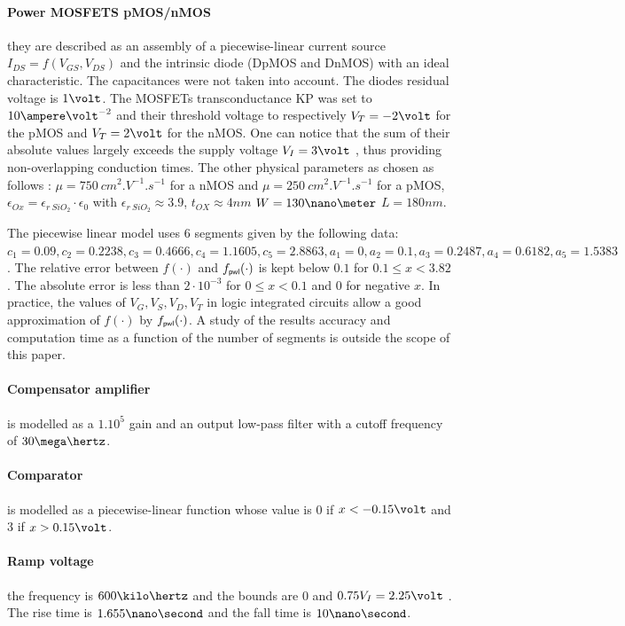 \paragraph{Power MOSFETS pMOS/nMOS} they are described as an assembly of a
piecewise-linear current source $I_{DS} = f(V_{GS}, V_{DS})$ and the intrinsic diode
(DpMOS and DnMOS) with an ideal characteristic.
The capacitances were not taken into account. The diodes residual voltage is
$1\volt$. 
The MOSFETs transconductance KP was set to $10 \ampere\volt^{-2}$ and
their threshold voltage to respectively $V_T = -2 \volt$ for the pMOS and $V_T= 2 \volt$ for
the nMOS. One can notice that the sum of their absolute values largely
exceeds the supply voltage $V_{I} = 3 \volt$ , thus providing non-overlapping
conduction times. The other physical parameters as chosen as follows : $\mu = 750~cm^2.V^{-1}.s^{-1}$ for a nMOS and $\mu=250~cm^2.V^{-1}.s^{-1}$ for a pMOS, $\epsilon_{Ox} = \epsilon_{r~SiO_2} \cdot \epsilon_0$ with $\epsilon_{r~SiO_2} \approx 3.9$, $t_{OX} \approx 4 nm$ $W = 130\nano \meter$ $L=180 nm$. 

The piecewise linear model uses $6$ segments given by the following data:$ c_1 = 0.09 , c_2=0.2238 ,
c_3=0.4666 , c_4=1.1605 , c_5=2.8863,  a_1 = 0 , a_2=0.1, a_3=0.2487 , a_4=0.6182 , a_5=1.5383$. The
relative error between $f(\cdot)$ and $f_\pwl(\cdot)$ is kept below $0.1$ for $0.1 \leq x < 3.82$.
The absolute error is less than $2 \cdot 10^{-3}$ for $0 \leq x < 0.1$ and $0$ for negative $x$. In
practice, the values of $V_G,V_S,V_D,V_T$ in logic integrated circuits allow  a good approximation
of $f(\cdot)$ by $f_\pwl(\cdot)$. A study of the results accuracy and computation time as a function
of the number of segments is outside the scope of this paper.


\paragraph{Compensator amplifier} is modelled as a $1.10^5$ gain and an output low-pass
filter with a cutoff frequency of $30 \mega\hertz$.
\paragraph{Comparator} is modelled as a piecewise-linear function whose value is $0$ if
$x < -0.15\volt$ and 3 if $x > 0.15\volt$.
\paragraph{Ramp voltage} the frequency is $600 \kilo\hertz$ and the bounds are $0$ and $0.75 V_I = 2.25 \volt$ .
The rise time is $1.655 \nano\second$ and the fall time is $10 \nano\second$.
